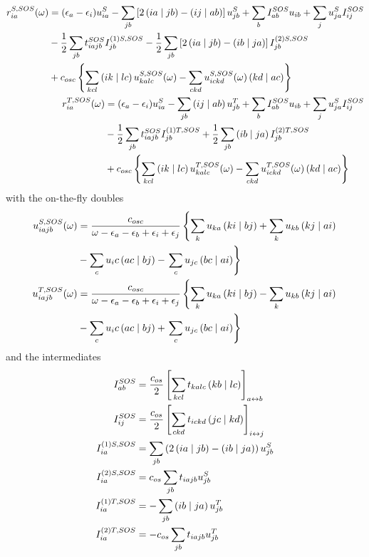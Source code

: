 \begin{align}
\begin{split}
r_{ia}^{S,SOS}(\omega) &= (\epsilon_a - \epsilon_i) u_{ia}^S - \sum_{jb} \left[ 2\left( ia \mid jb \right) - \left( ij \mid ab \right) \right] u_{jb}^S + \sum_b I^{SOS}_{ab} u_{ib} + \sum_j u_{ja}^S I^{SOS}_{ij} \\
&- \frac{1}{2} \sum_{jb} t^{SOS}_{iajb}I^{(1)S,SOS}_{jb} - \frac{1}{2} \sum_{jb} \left[ 2\left( ia \mid jb \right) - \left( ib \mid ja \right) \right] I^{(2)S,SOS}_{jb} \\
&+ c_{osc} \left\lbrace \sum_{kcl} \left( ik \mid lc \right) u^{S,SOS}_{kalc}(\omega) - \sum_{ckd} u^{S,SOS}_{ickd}(\omega) \left( kd \mid ac \right) \right\rbrace
\end{split}
\label{eq:SOSRADC2S}
\\
\begin{split}
r_{ia}^{T,SOS}(\omega) &= (\epsilon_a - \epsilon_i) u_{ia}^S - \sum_{jb} \left( ij \mid ab \right) u_{jb}^T + \sum_b I^{SOS}_{ab} u_{ib} + \sum_j u_{ja}^S I^{SOS}_{ij} \\
&- \frac{1}{2} \sum_{jb} t^{SOS}_{iajb}I^{(1)T,SOS}_{jb} + \frac{1}{2} \sum_{jb} \left( ib \mid ja \right) I^{(2)T,SOS}_{jb} \\
&+ c_{osc} \left\lbrace \sum_{kcl} \left( ik \mid lc \right) u^{T,SOS}_{kalc}(\omega) - \sum_{ckd} u^{T,SOS}_{ickd}(\omega) \left( kd \mid ac \right) \right\rbrace
\end{split}
\label{eq:SOSRADC2T}
\end{align}
\noindent with the on-the-fly doubles
\begin{align}
\begin{split}
u_{iajb}^{S,SOS}(\omega) &= \frac{c_{osc}}{\omega - \epsilon_a - \epsilon_b + \epsilon_i + \epsilon_j} \left\lbrace \sum_k u_{ka} \left( ki \mid bj \right) + \sum_{k} u_{kb} \left( kj \mid ai \right) \right. \\ 
&- \sum_c u_ic \left( ac \mid bj \right) - \left. \sum_{c} u_{jc} \left( bc \mid ai \right) \right\rbrace
\end{split} \label{eq:SOSU2S}
\\
\begin{split}
u_{iajb}^{T,SOS}(\omega) &= \frac{c_{osc}}{\omega - \epsilon_a - \epsilon_b + \epsilon_i + \epsilon_j} \left\lbrace \sum_k u_{ka} \left( ki \mid bj \right) - \sum_{k} u_{kb} \left( kj \mid ai \right) \right. \\ 
&- \sum_c u_ic \left( ac \mid bj \right) + \left. \sum_{c} u_{jc} \left( bc \mid ai \right) \right\rbrace
\end{split} \label{eq:SOSU2T}
\end{align}
\noindent and the intermediates
\begin{align}
I_{ab}^{SOS} &= \frac{c_{os}}{2} \left[ \sum_{kcl} t_{kalc} \left( kb \mid lc \right) \right]_{a \leftrightarrow b}
\\
I_{ij}^{SOS} &= \frac{c_{os}}{2} \left[ \sum_{ckd} t_{ickd} \left( jc \mid kd \right) \right]_{i \leftrightarrow j}
\\
I^{(1)S,SOS}_{ia} &= \sum_{jb} \left( 2\left( ia \mid jb \right) - \left( ib \mid ja \right) \right) u_{jb}^S
\\
I^{(2)S,SOS}_{ia} &= c_{os} \sum_{jb} t_{iajb} u_{jb}^S
\\
I^{(1)T,SOS}_{ia} &= - \sum_{jb} \left( ib \mid ja \right) u_{jb}^T
\\
I^{(2)T,SOS}_{ia} &= - c_{os} \sum_{jb} t_{iajb} u_{jb}^T
\end{align}

